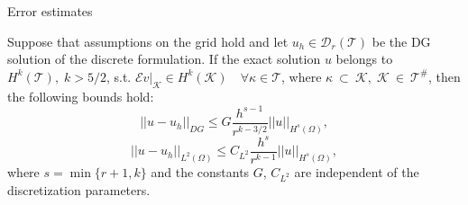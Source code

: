 \documentclass{beamer}
\begin{document}
\begin{frame}{Error estimates}
	\begin{theorem}
		Suppose that assumptions on the grid hold and let
		$u_h \in \mathcal{D}_r(\mathcal{T})$ be the DG solution of
		the discrete formulation. If the exact solution $u$ belongs to
		$H^k(\mathcal{T}), \; k>5/2$, s.t.
		$\mathcal{E}v|_\mathcal{K}\in H^k(\mathcal{K}) \quad \forall
		\kappa\in\mathcal{T}$, where $\kappa~\subset~\mathcal{K}, \;
		\mathcal{K}~\in~\mathcal{T}^\#$, then the following bounds hold:
		\begin{equation*}
			|\!|u-u_h|\!|_{DG} \leq G \frac{h^{s-1}}{r^{k-3/2}}
			|\!|u|\!|_{H^s(\Omega)},
		\end{equation*}
		\begin{equation*}
		|\!|u-u_h|\!|_{L^2(\Omega)} \leq C_{L^2} \frac{h^s}{r^{k-1}}
		|\!|u|\!|_{H^s(\Omega)},
		\end{equation*}
		where $s = \min \{r+1, k\}$ and the constants $G$, $C_{L^2}$ are
		independent of the discretization parameters.
	\end{theorem}
\end{frame}
\end{document}
